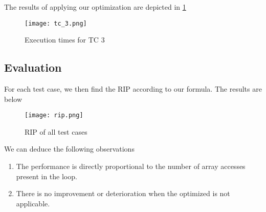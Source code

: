 The results of applying our optimization are depicted in \ref{TC_3}

\begin{figure}[H]
	\centering
	\texttt{[image: tc\_3.png]}
	\caption{Execution times for TC 3}
	\label{TC_3}	
\end{figure}

\pagebreak

\subsection{Evaluation}

For each test case, we then find the RIP according to our formula. The results are below 

\begin{figure}[H]
	\centering
	\texttt{[image: rip.png]}
	\caption{RIP of all test cases}
	\label{RIP}	
\end{figure}

We can deduce the following observations

\begin{enumerate}
	\item The performance is directly proportional to the number of array accesses present in the loop.
	\item There is no improvement or deterioration when the optimized is not applicable. 
\end{enumerate}
